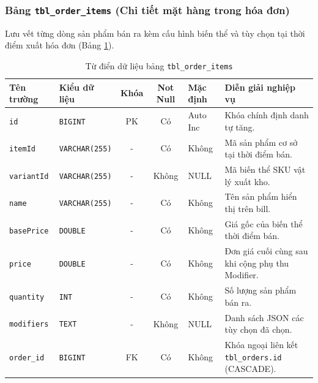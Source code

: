 \subsubsection{Bảng \texttt{tbl\_order\_items} (Chi tiết mặt hàng trong hóa đơn)}
Lưu vết từng dòng sản phẩm bán ra kèm cấu hình biến thể và tùy chọn tại thời điểm xuất hóa đơn (Bảng \ref{tab:tbl_order_items}).

\begin{table}[htbp]
\centering
\caption{Từ điển dữ liệu bảng \texttt{tbl\_order\_items}}
\label{tab:tbl_order_items}
\vspace{2mm}
\begin{tabularx}{\textwidth}{|p{2.5cm}|p{2.8cm}|c|c|p{1.8cm}|X|}
\hline
\textbf{Tên trường} & \textbf{Kiểu dữ liệu} & \textbf{Khóa} & \textbf{Not Null} & \textbf{Mặc định} & \textbf{Diễn giải nghiệp vụ} \\ \hline
\texttt{id} & \texttt{BIGINT} & PK & Có & Auto Inc & Khóa chính định danh tự tăng. \\ \hline
\texttt{itemId} & \texttt{VARCHAR(255)} & - & Có & Không & Mã sản phẩm cơ sở tại thời điểm bán. \\ \hline
\texttt{variantId} & \texttt{VARCHAR(255)} & - & Không & NULL & Mã biến thể SKU vật lý xuất kho. \\ \hline
\texttt{name} & \texttt{VARCHAR(255)} & - & Có & Không & Tên sản phẩm hiển thị trên bill. \\ \hline
\texttt{basePrice} & \texttt{DOUBLE} & - & Có & Không & Giá gốc của biến thể thời điểm bán. \\ \hline
\texttt{price} & \texttt{DOUBLE} & - & Có & Không & Đơn giá cuối cùng sau khi cộng phụ thu Modifier. \\ \hline
\texttt{quantity} & \texttt{INT} & - & Có & Không & Số lượng sản phẩm bán ra. \\ \hline
\texttt{modifiers} & \texttt{TEXT} & - & Không & NULL & Danh sách JSON các tùy chọn đã chọn. \\ \hline
\texttt{order\_id} & \texttt{BIGINT} & FK & Có & Không & Khóa ngoại liên kết \texttt{tbl\_orders.id} (CASCADE). \\ \hline
\end{tabularx}
\end{table}


